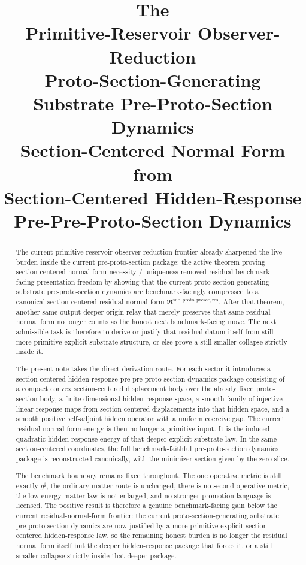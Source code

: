 \documentclass[11pt]{article}
\title{\textbf{The \TheoryName{}}\\[0.4em]
\large Primitive-Reservoir Observer-Reduction\\
\large Proto-Section-Generating Substrate Pre-Proto-Section Dynamics\\
\large Section-Centered Normal Form from\\
\large Section-Centered Hidden-Response\\
\large Pre-Pre-Proto-Section Dynamics}
\author{}
\date{}
\newcommand{\CompletedMetric}{g^{\sharp}}
\newcommand{\PreProtoSectionResidualPackage}{\mathfrak R^{\mathrm{sub,proto,presec,res}}}
\begin{document}
\maketitle

\begin{abstract}
The current primitive-reservoir observer-reduction frontier already sharpened the live burden inside the current pre-proto-section package: the active theorem proving section-centered normal-form necessity / uniqueness removed residual benchmark-facing presentation freedom by showing that the current proto-section-generating substrate pre-proto-section dynamics are benchmark-facingly compressed to a canonical section-centered residual normal form \(\PreProtoSectionResidualPackage\). After that theorem, another same-output deeper-origin relay that merely preserves that same residual normal form no longer counts as the honest next benchmark-facing move. The next admissible task is therefore to derive or justify that residual datum itself from still more primitive explicit substrate structure, or else prove a still smaller collapse strictly inside it.

The present note takes the direct derivation route. For each sector it introduces a section-centered hidden-response pre-pre-proto-section dynamics package consisting of a compact convex section-centered displacement body over the already fixed proto-section body, a finite-dimensional hidden-response space, a smooth family of injective linear response maps from section-centered displacements into that hidden space, and a smooth positive self-adjoint hidden operator with a uniform coercive gap. The current residual-normal-form energy is then no longer a primitive input. It is the induced quadratic hidden-response energy of that deeper explicit substrate law. In the same section-centered coordinates, the full benchmark-faithful pre-proto-section dynamics package is reconstructed canonically, with the minimizer section given by the zero slice.

The benchmark boundary remains fixed throughout. The one operative metric is still exactly \(\CompletedMetric\), the ordinary matter route is unchanged, there is no second operative metric, the low-energy matter law is not enlarged, and no stronger promotion language is licensed. The positive result is therefore a genuine benchmark-facing gain below the current residual-normal-form frontier: the current proto-section-generating substrate pre-proto-section dynamics are now justified by a more primitive explicit section-centered hidden-response law, so the remaining honest burden is no longer the residual normal form itself but the deeper hidden-response package that forces it, or a still smaller collapse strictly inside that deeper package.
\end{abstract}
\end{document}
